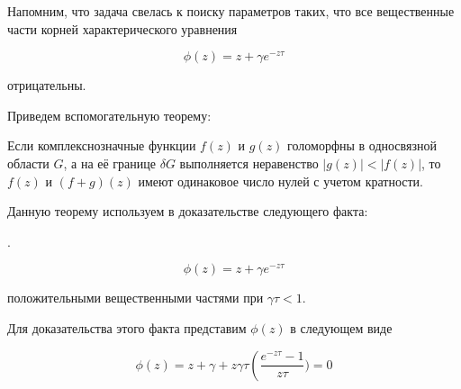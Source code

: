 Напомним, что задача свелась к поиску параметров таких, что все вещественные части корней характерического уравнения

\begin{equation}
\phi(z) = z + \gamma e^{-z \tau}
\end{equation}

отрицательны.

Приведем вспомогательную теорему:

 Если комплекснозначные функции $f(z)$ и $g(z)$ голоморфны в односвязной области $G$, а на её границе $\delta G$ выполняется неравенство $|g(z)| < |f(z)|$, то $f(z)$ и $(f+g)(z)$ имеют одинаковое число нулей с учетом кратности.

Данную теорему используем в доказательстве следующего факта:

.

\begin{equation*}
\phi(z) = z + \gamma e^{-z \tau}
\end{equation*}

положительными вещественными частями при $\gamma \tau < 1$.

Для доказательства этого факта представим $\phi (z)$ в следующем виде

\begin{equation}
\phi(z) = z + \gamma + z \gamma \tau \left(\dfrac{e^{-z \tau} - 1}{z \tau}) = 0
\end{equation}
